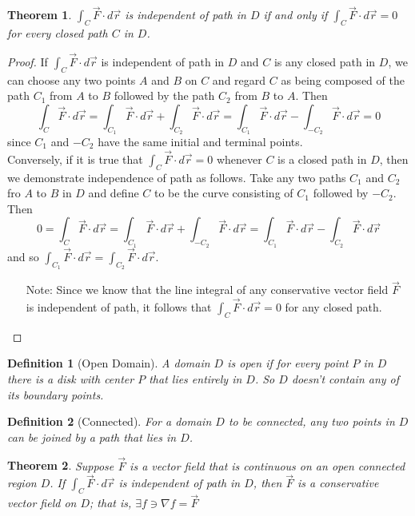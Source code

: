 \documentclass[10pt]{report}
\newtheorem{thm2}{Theorem}[section]
\newtheorem{def2}{Definition}[section]
\newcommand{\grad}{\nabla}
\begin{document}
\begin{thm2}
$\int_C \vec{F}\cdot d\vec{r}$ is independent of path in $D$ if and only if $\int_C\vec{F}\cdot d\vec{r}=0$ for every closed path $C$ in $D$.
\end{thm2}
\begin{proof}
If $\int_C \vec{F}\cdot d\vec{r}$ is independent of path in $D$ and $C$ is any closed path in $D$, we can choose any two points $A$ and $B$ on $C$ and regard $C$ as being composed of the path $C_1$ from $A$ to $B$ followed by the path $C_2$ from $B$ to $A$. Then
$$\int_C \vec{F}\cdot d\vec{r} = \int_{C_1}\vec{F}\cdot d\vec{r} + \int_{C_2}\vec{F}\cdot d\vec{r} = \int_{C_1}\vec{F}\cdot d\vec{r} - \int_{-C_2} \vec{F}\cdot d\vec{r}=0$$
since $C_1$ and $-C_2$ have the same initial and terminal points.\\
Conversely, if it is true that $\int_C \vec{F}\cdot d\vec{r}=0$ whenever $C$ is a closed path in $D$, then we demonstrate independence of path as follows. Take any two paths $C_1$ and $C_2$ fro $A$ to $B$ in $D$ and define $C$ to be the curve consisting of $C_1$ followed by $-C_2$. Then
$$0=\int_C \vec{F}\cdot d\vec{r} = \int_{C_1} \vec{F}\cdot d\vec{r} + \int_{-C_2} \vec{F}\cdot d\vec{r} = \int_{C_1} \vec{F}\cdot d\vec{r} - \int_{C_2} \vec{F}\cdot d\vec{r}$$
and so $\int_{C_1} \vec{F}\cdot d\vec{r} = \int_{C_2} \vec{F}\cdot d\vec{r}$.
\begin{itemize}
\item[Note:] Since we know that the line integral of any conservative vector field $\vec{F}$ is independent of path, it follows that $\int_C \vec{F}\cdot d\vec{r} =0$ for any closed path.
\end{itemize}
\end{proof}
\begin{def2}[Open Domain]
A domain $D$ is open if for every point $P$ in $D$ there is a disk with center $P$ that lies entirely in $D$. So $D$ doesn't contain any of its boundary points. 
\end{def2}
\begin{def2}[Connected]
For a domain $D$ to be connected, any two points in $D$ can be joined by a path that lies in $D$.
\end{def2}
\begin{thm2}
Suppose $\vec{F}$ is a vector field that is continuous on an open connected region $D$. If $\int_C \vec{F}\cdot d\vec{r}$ is independent of path in $D$, then $\vec{F}$ is a conservative vector field on $D$; that is, $\exists f\ni \grad f=\vec{F}$
\end{thm2}
\end{document}
